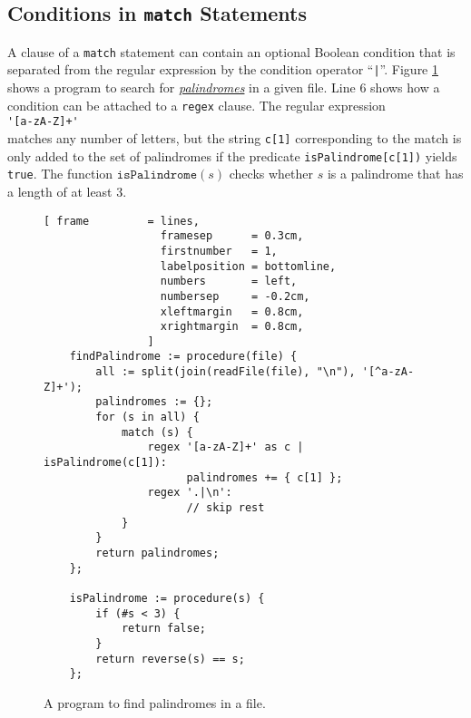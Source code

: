 \subsection{Conditions in \texttt{match} Statements}
A clause of a \texttt{match} statement can contain an optional Boolean condition that is
separated from the regular expression by the condition operator ``\texttt{|}''.   Figure
\ref{fig:find-palindrome.stlx} shows a program to search for 
\href{http://en.wikipedia.org/wiki/Palindrome}{\emph{palindromes}} 
in a given file.
Line 6 shows how a condition can be attached to a \texttt{regex} clause. The regular
expression 
\\[0.2cm]
\hspace*{1.3cm}
\verb|'[a-zA-Z]+'|
\\[0.2cm]
matches any number of letters, but the string \texttt{c[1]} corresponding to the match
is only added to the set of palindromes if the predicate \texttt{isPalindrome[c[1])} yields
\texttt{true}.  The function $\texttt{isPalindrome}(s)$ checks whether $s$ is a palindrome that has
a length of at least 3.

\begin{figure}[!ht]
\centering
\begin{Verbatim}[ frame         = lines, 
                  framesep      = 0.3cm, 
                  firstnumber   = 1,
                  labelposition = bottomline,
                  numbers       = left,
                  numbersep     = -0.2cm,
                  xleftmargin   = 0.8cm,
                  xrightmargin  = 0.8cm,
                ]
    findPalindrome := procedure(file) {
        all := split(join(readFile(file), "\n"), '[^a-zA-Z]+');
        palindromes := {};
        for (s in all) {
            match (s) {
                regex '[a-zA-Z]+' as c | isPalindrome(c[1]): 
                      palindromes += { c[1] };
                regex '.|\n': 
                      // skip rest
            }
        }
        return palindromes;        
    };
    
    isPalindrome := procedure(s) {
        if (#s < 3) {
            return false;
        }
        return reverse(s) == s;
    };
\end{Verbatim}
\vspace*{-0.3cm}
\caption{A program to find palindromes in a file.}
\label{fig:find-palindrome.stlx}
\end{figure}


